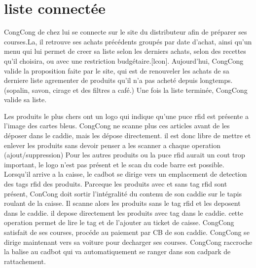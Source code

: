 \section{liste connectée}

CongCong de chez lui se connecte sur le site du distributeur afin de préparer ses courses.La, il retrouve ses achats précédents groupés par date d'achat, ainsi qu'un menu qui lui permet de creer sa liste selon les derniers achats, selon des recettes qu'il choisira, ou avec une restriction budgétaire.[lcon]. Aujourd'hui, CongCong valide la proposition faite par le site, qui est de renouveler les achats de sa derniere liste agrementer de produits qu'il n'a pas acheté depuis longtemps. (sopalin, savon, cirage et des filtres a café.)
Une fois la liste terminée, CongCong valide sa liste.

Les produits le plus chers ont un logo qui indique qu'une puce rfid est présente a l'image des cartes bleus. 
CongCong ne scanne plus ces articles avant de les déposer dans le caddie, mais les dépose directement.
il est donc libre de mettre et enlever les produits sans devoir penser a les scanner a chaque operation (ajout/suppression)
Pour les autres produits ou la puce rfid aurait un cout trop important, le logo n'est pas présent et le scan du code barre est possible.
Lorsqu'il arrive a la caisse, le cadbot se dirige vers un emplacement de detection des tags rfid des produits.
Parceque les produits avec et sans tag rfid sont présent, ConCong doit sortir l'intégralité du contenu de son caddie sur le tapis roulant de la caisse.
Il scanne alors les produits sans le tag rfid et les deposent dans le caddie. il depose directement les produits avec tag dans le caddie. cette operation permet de lire le tag et de l'ajouter au ticket de caisse.
CongCong satisfait de ses courses, procéde au paiement par CB de son caddie.
CongCong se dirige maintenant vers sa voiture pour decharger ses courses.
CongCong raccroche la balise au cadbot qui va automatiquement se ranger dans son cadpark de rattachement.


